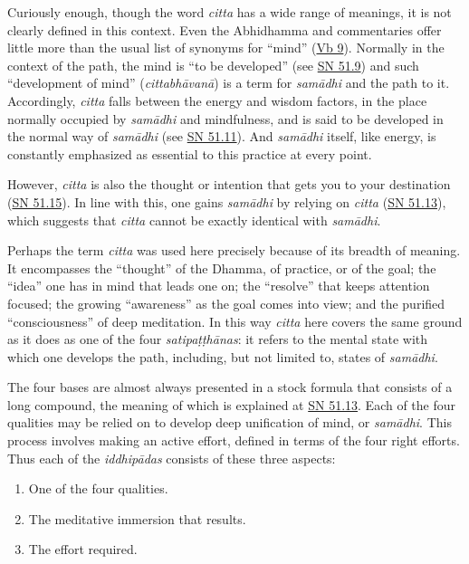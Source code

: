 \documentclass[12pt,openany]{book}%
\begin{document}
Curiously enough, though the word \textit{citta} has a wide range of meanings, it is not clearly defined in this context. Even the Abhidhamma and commentaries offer little more than the usual list of synonyms for “mind” (\href{https://suttacentral.net/vb9}{Vb 9}). Normally in the context of the path, the mind is “to be developed” (see \href{https://suttacentral.net/sn51.9}{SN 51.9}) and such “development of mind” (\textit{\textsanskrit{cittabhāvanā}}) is a term for \textit{\textsanskrit{samādhi}} and the path to it. Accordingly, \textit{citta} falls between the energy and wisdom factors, in the place normally occupied by \textit{\textsanskrit{samādhi}} and mindfulness, and is said to be developed in the normal way of \textit{\textsanskrit{samādhi}} (see \href{https://suttacentral.net/sn51.11}{SN 51.11}). And \textit{\textsanskrit{samādhi}} itself, like energy, is constantly emphasized as essential to this practice at every point.

However, \textit{citta} is also the thought or intention that gets you to your destination (\href{https://suttacentral.net/sn51.15}{SN 51.15}). In line with this, one gains \textit{\textsanskrit{samādhi}} by relying on \textit{citta} (\href{https://suttacentral.net/sn51.13}{SN 51.13}), which suggests that \textit{citta} cannot be exactly identical with \textit{\textsanskrit{samādhi}}.

Perhaps the term \textit{citta} was used here precisely because of its breadth of meaning. It encompasses the “thought” of the Dhamma, of practice, or of the goal; the “idea” one has in mind that leads one on; the “resolve” that keeps attention focused; the growing “awareness” as the goal comes into view; and the purified “consciousness” of deep meditation. In this way \textit{citta} here covers the same ground as it does as one of the four \textit{\textsanskrit{satipaṭṭhānas}}: it refers to the mental state with which one develops the path, including, but not limited to, states of \textit{\textsanskrit{samādhi}}.

The four bases are almost always presented in a stock formula that consists of a long compound, the meaning of which is explained at \href{https://suttacentral.net/sn51.13}{SN 51.13}. Each of the four qualities may be relied on to develop deep unification of mind, or \textit{\textsanskrit{samādhi}}. This process involves making an active effort, defined in terms of the four right efforts. Thus each of the \textit{\textsanskrit{iddhipādas}} consists of these three aspects:

\begin{enumerate}%
\item One of the four qualities.%
\item The meditative immersion that results.%
\item The effort required.%
\end{enumerate}
\end{document}

